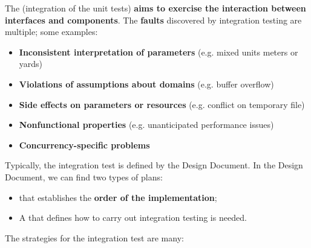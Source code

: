 \highspace
The  (integration of the unit tests) \textbf{aims to exercise the interaction between interfaces and components}. The \textbf{faults} discovered by integration testing are multiple; some examples:
\begin{itemize}
    \item \textbf{Inconsistent interpretation of parameters} (e.g. mixed units meters or yards)

    \item \textbf{Violations of assumptions about domains} (e.g. buffer overflow)

    \item \textbf{Side effects on parameters or resources} (e.g. conflict on temporary file)

    \item \textbf{Nonfunctional properties} (e.g. unanticipated performance issues)

    \item \textbf{Concurrency-specific problems}
\end{itemize}
Typically, the integration test is defined by the Design Document. In the Design Document, we can find two types of plans:
\begin{itemize}
    \item {} that establishes the \textbf{order of the implementation};
    \item A  that defines how to carry out integration testing is needed.
\end{itemize}
The strategies for the integration test are many:
